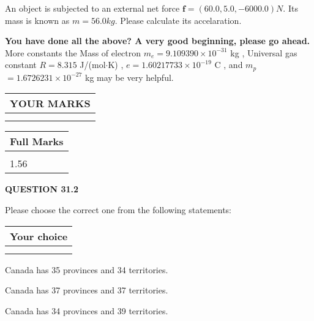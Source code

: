 \documentclass[12pt]{article}
\begin{document}
  
 
An object is subjected to an external net force $\mathbf{f}=(
60.0,  %
5.0,
-6000.0  )N$. Its mass is known as
$m= %
56.0 kg$. Please calculate its accelaration.
 
 

 

 
\vspace{0.3in}
   
   
\vspace{0.3in}
{\textbf{\LARGE{You have done all the above? A very good beginning, please go ahead.}}}
More constants the
Mass of electron
$m_e$$ =
9.109390 \times 10^{-31} $
kg
,
Universal gas constant
$R$$ =
8.315 $
J/(mol$\cdot $K)
,
$e$$ =
1.60217733 \times 10^{-19} $
C
, and
$m_p$$ =
1.6726231 \times 10^{-27} $
kg
%
may be very helpful.
\vspace{0.3in}
   
   
  
\vspace{0.2in}
  
\noindent\begin{tabular}{|l|}
\hline
 YOUR MARKS  \\
\hline
 \\ 
 \\ 
\hline
\end{tabular}
\hspace{0.05in} \begin{tabular}{|l|}
\hline
 Full Marks  \\
\hline
 \\ 
1.56 \\
\hline
\end{tabular}
{\textbf{\Large{QUESTION
31.2 
}}}
  
  
Please choose the correct one from the following statements:
  
  
\noindent\hspace{3.0in} \begin{tabular}{|l|}
\hline
Your choice \\
\hline
 \\ 
 \\ 
\hline
\end{tabular}
  
  
 
 
Canada has  %
35 provinces and  %
34 territories.
 
 
Canada has  %
37 provinces and  %
37 territories.
 
 
Canada has  %
34 provinces and  %
39 territories.
 
\end{document}
